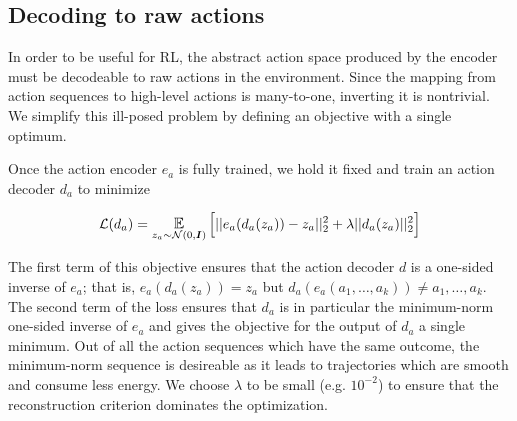 \subsection{Decoding to raw actions}

In order to be useful for RL, the abstract action space produced by the encoder must be decodeable to raw actions in the environment.
Since the mapping from action sequences to high-level actions is many-to-one, inverting it is nontrivial.
We simplify this ill-posed problem by defining an objective with a single optimum.

Once the action encoder $e_a$ is fully trained, we hold it fixed and train an action decoder $d_a$ to minimize

\begin{align}
\mathcal{L}(d_a) = \E_{z_a \sim \mathcal{N}(0, \mI)} \Big[ || e_a(d_a(z_a)) - z_a ||_2^2 + \lambda || d_a(z_a) ||_2^2 \Big] \label{eq:decoder}
\end{align}

The first term of this objective ensures that the action decoder $d$ is a one-sided inverse of $e_a$; that is, $e_a(d_a(z_a)) = z_a$ but $d_a(e_a(a_1, \ldots, a_k)) \ne a_1, \ldots, a_k$.
The second term of the loss ensures that $d_a$ is in particular the minimum-norm one-sided inverse of $e_a$ and gives the objective for the output of $d_a$ a single minimum.
Out of all the action sequences which have the same outcome, the minimum-norm sequence is desireable as it leads to trajectories which are smooth and consume less energy.
We choose $\lambda$ to be small (e.g. $10^{-2}$) to ensure that the reconstruction criterion dominates the optimization.





